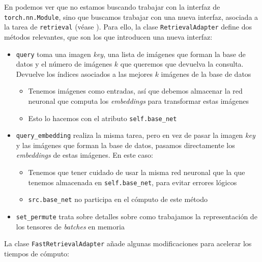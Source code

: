 En  podemos ver que no estamos buscando trabajar con la interfaz de \lstinline{torch.nn.Module}, sino que buscamos trabajar con una nueva interfaz, asociada a la tarea de \lstinline{retrieval} (véase ). Para ello, la clase \lstinline{RetrievalAdapter} define dos métodos relevantes, que son los que introducen una nueva interfaz:

\begin{itemize}
    \item \lstinline{query} toma una imagen \textit{key}, una lista de imágenes que forman la base de datos y el número de imágenes $k$ que queremos que devuelva la consulta. Devuelve los índices asociados a las mejores $k$ imágenes de la base de datos
        \begin{itemize}
            \item Tenemos imágenes como entradas, así que debemos almacenar la red neuronal que computa los \textit{embeddings} para transformar estas imágenes
            \item Esto lo hacemos con el atributo \lstinline{self.base_net}
        \end{itemize}
    \item \lstinline{query_embedding} realiza la misma tarea, pero en vez de pasar la imagen \textit{key} y las imágenes que forman la base de datos, pasamos directamente los \textit{embeddings} de estas imágenes. En este caso:
        \begin{itemize}
            \item Tenemos que tener cuidado de usar la misma red neuronal que la que tenemos almacenada en \lstinline{self.base_net}, para evitar errores lógicos
            \item \lstinline{src.base_net} no participa en el cómputo de este método
        \end{itemize}
    \item \lstinline{set_permute} trata sobre detalles sobre como trabajamos la representación de los tensores de \textit{batches} en memoria
\end{itemize}

La clase \lstinline{FastRetrievalAdapter} añade algunas modificaciones para acelerar los tiempos de cómputo:

